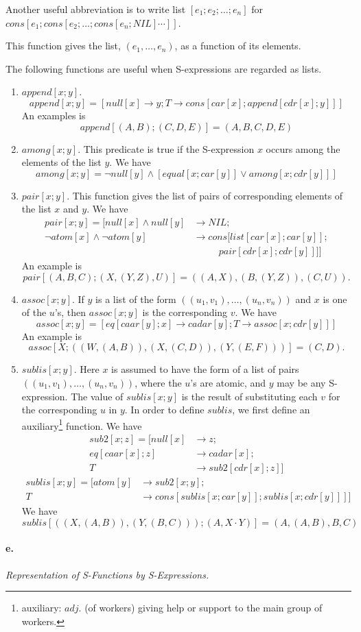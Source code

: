 \documentclass[11pt, a4paper]{article}
\begin{document}
Another useful abbreviation is to write list $[e_1; e_2; \ldots; e_n]$ for\\
{$cons[e_1; cons[e_2; \ldots; cons[e_n; NIL] \cdots ]]$}.

This function gives the list, $(e_1, \ldots, e_n)$, as a function of its
elements.

The following functions are useful when S-expressions are regarded as lists.
\begin{enumerate}
\item $append[x; y]$.
  $$ append[x; y] = [null[x] \to y; T \to cons[car[x]; append[cdr[x]; y]]] $$
  An examples is
  $$ append[(A, B); (C, D, E)] = (A, B, C, D, E) $$
\item $among[x; y]$. This predicate is true if the S-expression $x$ occurs among
  the elements of the list $y$. We have
  $$ among[x; y] =
     \lnot null[y] \land [equal[x; car[y]] \lor among[x; cdr[y]]] $$
\item $pair[x; y]$. This function gives the list of pairs of corresponding
  elements of the list $x$ and $y$. We have
  \begin{align*}
    pair[x; y] = [null[x] \land null[y] &\to NIL;                       \\
      \lnot atom[x] \land \lnot atom[y] &\to cons[list[car[x]; car[y]]; \\
                                &\ \ \ \ \ \ \ \ \ \ \ \ pair[cdr[x]; cdr[y]]]]
  \end{align*}
  An example is
  $$ pair[(A, B, C); (X, (Y, Z), U)] = ((A, X), (B, (Y, Z)), (C, U)) \text{.} $$
\item $assoc[x; y]$. If $y$ is a list of the form $((u_1, v_1), \ldots, (u_n,
  v_n))$ and $x$ is one of the $u$'s, then $assoc[x; y]$ is the corresponding
  $v$. We have
  $$ assoc[x; y] = [eq[caar[y]; x] \to cadar[y]; T \to assoc[x; cdr[y]]] $$
  An example is
  $$ assoc[X; ((W, (A, B)), (X, (C, D)), (Y, (E, F)))] = (C, D) \text{.} $$
\item $sublis[x; y]$. Here $x$ is assumed to have the form of a list of pairs
  $((u_1, v_1), \ldots, (u_n, v_n))$, where the $u$'s are atomic, and $y$ may be
  any S-expression. The value of $sublis[x; y]$ is the result of substituting
  each $v$ for the corresponding $u$ in $y$. In order to define $sublis$, we
  first define an
  auxiliary\footnote{auxiliary: $adj.$ (of workers) giving help or support to
    the main group of workers.}
  function. We have
  \begin{align*}
  sub2[x; z] = [null[x] &\to z;        \\
         eq[caar[x]; z] &\to cadar[x]; \\
                      T &\to sub2[cdr[x]; z]]
  \end{align*}
  \begin{align*}
  sublis[x; y] = [atom[y] &\to sub2[x; y]; \\
                        T &\to cons[sublis[x; car[y]]; sublis[x; cdr[y]]]]
  \end{align*}
  We have
  $$ sublis[((X, (A, B)), (Y, (B, C))); (A, X \cdot Y)] = (A, (A, B), B, C) $$
\end{enumerate}

\paragraph{e.}\textit{Representation of S-Functions by S-Expressions.}
\end{document}
